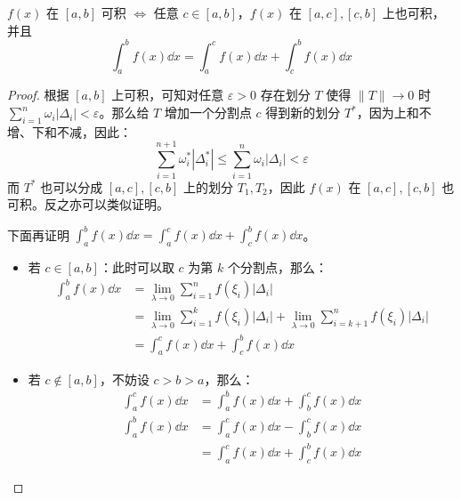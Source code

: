 \begin{property}[积分区间可加性]
	$f(x)$ 在 $[a, b]$ 可积 $\Leftrightarrow$ 任意 $c \in [a, b]$，$f(x)$ 在 $[a, c], [c, b]$ 上也可积，并且
	$$
	\int_a^b f(x) \dd x = \int_a^c f(x) \dd x + \int_c^b f(x) \dd x
	$$
	\begin{proof}
		根据 $[a, b]$ 上可积，可知对任意 $\varepsilon > 0$ 存在划分 $T$ 使得 $\lVert T \rVert \to 0$ 时 $\sum_{i=1}^n \omega_i |\Delta_i| < \varepsilon$。那么给 $T$ 增加一个分割点 $c$ 得到新的划分 $T^*$，因为上和不增、下和不减，因此：
		$$
		\sum_{i=1}^{n+1} \omega^*_i |\Delta^*_i| \le \sum_{i=1}^n \omega_i |\Delta_i| < \varepsilon
		$$
		而 $T^*$ 也可以分成 $[a, c], [c, b]$ 上的划分 $T_1, T_2$，因此 $f(x)$ 在 $[a, c], [c, b]$ 也可积。反之亦可以类似证明。

		下面再证明 $\int_a^b f(x) \dd x = \int_a^c f(x) \dd x + \int_c^b f(x) \dd x$。

		\begin{itemize}
			\item 若 $c \in [a, b]$：此时可以取 $c$ 为第 $k$ 个分割点，那么：
			$$
			\begin{aligned}
				\int_a^b f(x) \dd x & = \lim_{\lambda \to 0} \sum_{i=1}^n f(\xi_i) |\Delta_i| \\
				& = \lim_{\lambda \to 0} \sum_{i=1}^k f(\xi_i) |\Delta_i| + \lim_{\lambda \to 0} \sum_{i=k+1}^n f(\xi_i) |\Delta_i| \\
				& = \int_a^c f(x) \dd x + \int_c^b f(x) \dd x
			\end{aligned}
			$$

			\item 若 $c \notin [a, b]$，不妨设 $c > b > a$，那么：
			$$
			\begin{aligned}
				\int_a^c f(x) \dd x & = \int_a^b f(x) \dd x + \int_b^c f(x) \dd x \\
				\int_a^b f(x) \dd x & = \int_a^c f(x) \dd x - \int_b^c f(x) \dd x \\
				& = \int_a^c f(x) \dd x + \int_c^b f(x) \dd x
			\end{aligned}
			$$
		\end{itemize}
	\end{proof}
\end{property}